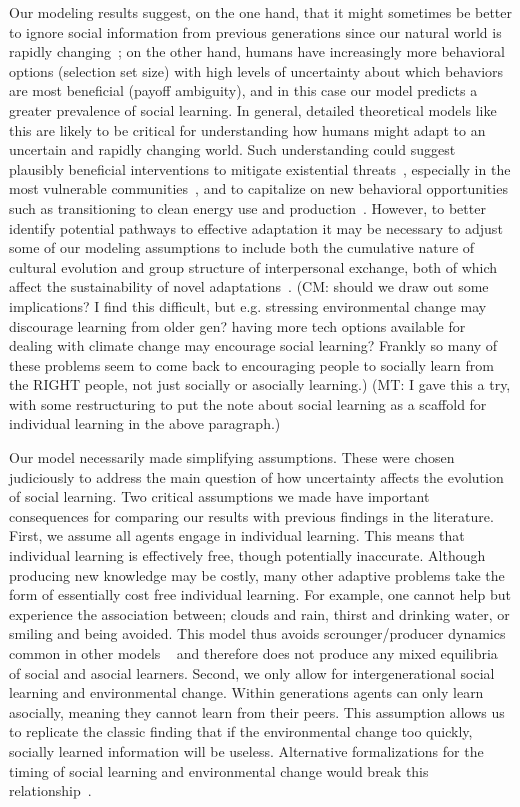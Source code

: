 \documentclass[letterpaper,11.5pt]{scrartcl}
\newcommand{\mt}[1]{{\textcolor{myorange} {({\tiny MT:} #1)}}}
\newcommand{\cm}[1]{{\textcolor{mypurple} {({\tiny CM:} #1)}}}
\begin{document}
Our modeling results suggest, on the one hand, that it might sometimes be better to
ignore social information from previous generations since our natural world is
rapidly changing~\citep{IPCC2022}; on the other hand, humans have increasingly more
behavioral options (selection set size) with high levels of uncertainty about which behaviors are most beneficial (payoff ambiguity), and in this case our model predicts a greater prevalence of social learning.
In general, detailed theoretical models like this are likely to be critical for understanding how humans might adapt to an uncertain and rapidly changing world.
Such understanding could suggest plausibly beneficial interventions to mitigate existential threats~\citep{Moya2020,Jones2021}, especially in
the most vulnerable communities~\citep{McNamara2020}, and to capitalize on new behavioral opportunities such as transitioning to clean energy use and
production~\citep{NatureEnergyEditorialPromisesPremises2018,Brisbois2022}. However, to better identify
potential pathways to effective adaptation it may be necessary to adjust some of our modeling assumptions to
include both the cumulative nature of cultural evolution and group structure of interpersonal exchange, both
of which affect the sustainability of novel adaptations~\citep{Derex2020,Centola2018,Smaldino2021a}.
\cm{should we draw out some implications? I find this difficult, but e.g. stressing environmental change may discourage learning from older gen? having more tech options available for dealing with climate change may encourage social learning? Frankly so many of these problems seem to come back to encouraging people to socially learn from the RIGHT people, not just socially or asocially learning.} \mt{I gave this a try, with some restructuring to put the note about social learning as a scaffold for individual learning in the above paragraph.}

Our model necessarily made simplifying assumptions. These were chosen judiciously to address the main
question of how uncertainty affects the evolution of social learning. Two critical assumptions we made have
important consequences for comparing our results with previous findings in the literature. First, we assume
all agents engage in individual learning. This means that individual learning is effectively free, though
potentially inaccurate. Although producing new knowledge may be costly, many other adaptive problems take
the form of essentially cost free individual learning. For example, one cannot help but experience the association between; clouds and rain, thirst and drinking water, or smiling and
being avoided. This model thus avoids scrounger/producer dynamics common in other models
~\citep{BoydRicherson1985,Rogers1988} and therefore does not produce any mixed equilibria of social and
asocial learners.  Second, we only allow for intergenerational social learning and environmental change.
Within generations agents can only learn asocially, meaning they cannot learn from their peers. This
assumption allows us to replicate the classic finding that if the environmental change too quickly, socially
learned information will be useless. Alternative formalizations for the timing of social learning and
environmental change would break this relationship~\citep{Turner2022}. 
\end{document}
